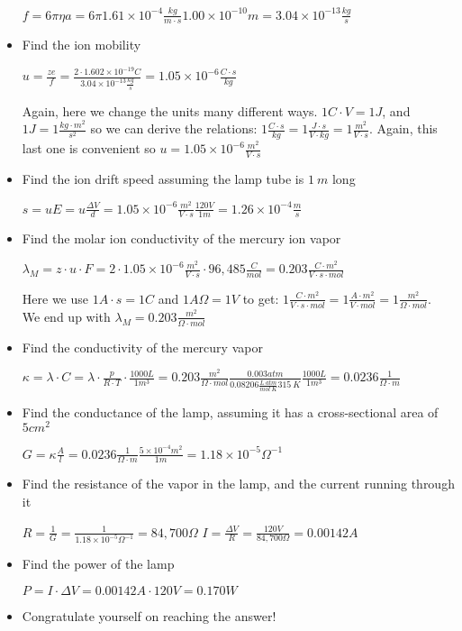 \documentclass[11pt, letterpaper]{memoir}
\begin{document}
\begin{itemize}
	$f=6\pi \eta a = 6\pi1.61\times10^{-4}\frac{kg}{m\cdot s}1.00\times10^{-10}m= 3.04\times10^{-13}\frac{kg}{s}$
	\item Find the ion mobility 
	
	$u=\frac{ze}{f}=\frac{2\cdot 1.602\times10^{-19}C}{3.04\times10^{-13}\frac{kg}{s}}=1.05\times10^{-6}\frac{C\cdot s}{kg}$
	
	Again, here we change the units many different ways. $1C\cdot V=1J$, and $1J=1\frac{kg\cdot m^2}{s^2}$ so we can derive the relations: $1\frac{C\cdot s}{kg}=1\frac{J\cdot s}{V\cdot kg}=1\frac{m^2}{V\cdot s}$. Again, this last one is convenient so $u=1.05\times10^{-6}\frac{m^2}{V\cdot s}$
	\item Find the ion drift speed assuming the lamp tube is $1~m$ long
	
	$s=uE=u\frac{\Delta V}{d}=1.05\times10^{-6}\frac{m^2}{V\cdot s}\frac{120V}{1m}= 1.26\times10^{-4}\frac{m}{s}$
	\item Find the molar ion conductivity of the mercury ion vapor
	
	
	$\lambda_M = z\cdot u\cdot F = 2 \cdot 1.05\times10^{-6}\frac{m^2}{V\cdot s}\cdot 96,485 \frac{C}{mol} = 0.203\frac{C\cdot m^2}{V\cdot s\cdot mol}$
	
	Here we use $1A\cdot s = 1C$ and $1A\Omega=1V$ to get: $1\frac{C\cdot m^2}{V\cdot s\cdot mol} = 1 \frac{A\cdot m^2}{V\cdot mol} = 1 \frac{m^2}{\Omega\cdot mol}$. \\We end up with $\lambda_M = 0.203\frac{m^2}{\Omega\cdot mol}$
	\item Find the conductivity of the mercury vapor
	
	$\kappa = \lambda \cdot C = \lambda \cdot \frac{p}{R\cdot T}\cdot\frac{1000L}{1m^3} = 0.203\frac{m^2}{\Omega\cdot mol}\frac{0.003atm}{0.08206\frac{L~atm}{mol~K}315~K}\frac{1000L}{1m^3}=0.0236\frac{1}{\Omega\cdot m}$
	
	\item Find the conductance of the lamp, assuming it has a cross-sectional area of $5cm^2$
	
	$G=\kappa\frac{A}{l}=0.0236\frac{1}{\Omega\cdot m}\frac{5\times10^{-4}m^2}{1m}=1.18\times10^{-5}\Omega^{-1}$
	
	\item Find the resistance of the  vapor in the lamp, and the current running through it
	
	$R=\frac{1}{G}=\frac{1}{1.18\times10^{-5}\Omega^{-1}}= 84,700\Omega$ \hspace{5em} $I=\frac{\Delta V}{R}=\frac{120V}{84,700\Omega}= 0.00142A$
	\item Find the power of the lamp
	
	$P=I\cdot \Delta V=0.00142A\cdot 120V=0.170W$
	\item Congratulate yourself on reaching the answer!
\end{itemize}
\end{document}
